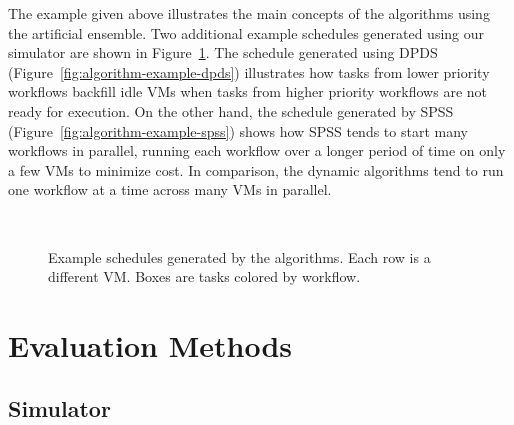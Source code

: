 \documentclass[preprint,5p]{elsarticle}
\begin{document}
The example given above illustrates the main concepts of the algorithms using the artificial ensemble.
Two additional example schedules generated using our simulator are shown in 
Figure~\ref{fig:examples-simulated}. 
The schedule generated using DPDS (Figure~\ref{fig:algorithm-example-dpds})
illustrates how tasks from lower priority workflows backfill idle VMs when
tasks from higher priority workflows are not ready for execution.
On the other hand, the schedule generated by SPSS (Figure~\ref{fig:algorithm-example-spss})
shows how SPSS tends to start many workflows in parallel, running each workflow
over a longer period of time on only a few VMs to minimize cost. In comparison,
the dynamic algorithms tend to run one workflow at a time across many VMs in
parallel.

\begin{figure}[tb] 
  \centering
  \\
  \caption[Example schedules generated by the algorithms]{Example
  schedules generated by the algorithms. Each row is a different
  VM. Boxes are tasks colored by workflow.}
  \label{fig:examples-simulated}

\end{figure}




\section{Evaluation Methods}
\label{sec:performance}


\subsection{Simulator}
\end{document}
